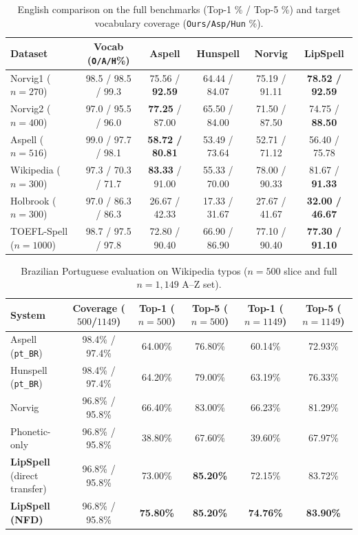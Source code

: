 \documentclass[preprint,12pt,authoryear]{elsarticle}
\begin{document}
\begin{table}[ht]
\centering
\scriptsize
\setlength{\tabcolsep}{3pt}
\caption{English comparison on the full benchmarks (Top-1 \% / Top-5 \%) and target vocabulary coverage (\texttt{Ours/Asp/Hun} \%).}
\label{tab:english_cmp}
\begin{tabular}{lccccc}
\toprule
Dataset & Vocab (\texttt{O/A/H}\%) & Aspell & Hunspell & Norvig & LipSpell \\
\midrule
Norvig1 ($n=270$)      & 98.5 / 98.5 / 99.3 & 75.56 / \textbf{92.59} & 64.44 / 84.07 & 75.19 / 91.11 & \textbf{78.52 / 92.59} \\
Norvig2 ($n=400$)      & 97.0 / 95.5 / 96.0 & \textbf{77.25} / 87.00 & 65.50 / 84.00 & 71.50 / 87.50 & 74.75 / \textbf{88.50} \\
Aspell ($n=516$)       & 99.0 / 97.7 / 98.1 & \textbf{58.72 / 80.81} & 53.49 / 73.64 & 52.71 / 71.12 & 56.40 / 75.78 \\
Wikipedia ($n=300$)    & 97.3 / 70.3 / 71.7 & \textbf{83.33} / 91.00 & 55.33 / 70.00 & 78.00 / 90.33 & 81.67 / \textbf{91.33} \\
Holbrook ($n=300$)     & 97.0 / 86.3 / 86.3 & 26.67 / 42.33 & 17.33 / 31.67 & 27.67 / 41.67 & \textbf{32.00 / 46.67} \\
TOEFL-Spell ($n=1000$) & 98.7 / 97.5 / 97.8 & 72.80 / 90.40 & 66.90 / 86.90 & 77.10 / 90.40 & \textbf{77.30 / 91.10} \\
\bottomrule
\end{tabular}
\end{table}

\begin{table}[ht]
\centering
\scriptsize
\setlength{\tabcolsep}{3pt}
\caption{Brazilian Portuguese evaluation on Wikipedia typos ($n=500$ slice and full $n=1{,}149$ A--Z set).}
\label{tab:ptbr}
\begin{tabular}{lccccc}
\toprule
System & Coverage ($500$/$1149$) & Top-1 ($n=500$) & Top-5 ($n=500$) & Top-1 ($n=1149$) & Top-5 ($n=1149$) \\
\midrule
Aspell (\texttt{pt\_BR})            & 98.4\% / 97.4\% & 64.00\% & 76.80\% & 60.14\% & 72.93\% \\
Hunspell (\texttt{pt\_BR})          & 98.4\% / 97.4\% & 64.20\% & 79.00\% & 63.19\% & 76.33\% \\
Norvig                              & 96.8\% / 95.8\% & 66.40\% & 83.00\% & 66.23\% & 81.29\% \\
Phonetic-only                       & 96.8\% / 95.8\% & 38.80\% & 67.60\% & 39.60\% & 67.97\% \\
\textbf{LipSpell} (direct transfer) & 96.8\% / 95.8\% & 73.00\% & \textbf{85.20\%} & 72.15\% & 83.72\% \\
\textbf{LipSpell (NFD)}             & 96.8\% / 95.8\% & \textbf{75.80\%} & \textbf{85.20\%} & \textbf{74.76\%} & \textbf{83.90\%} \\
\bottomrule
\end{tabular}
\end{table}
\end{document}

